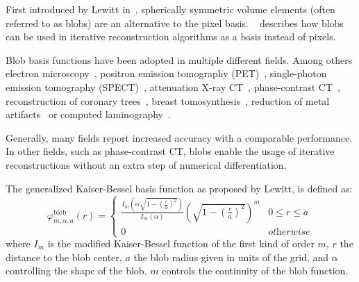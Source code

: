 First introduced by Lewitt in~\cite{lewitt_multidimensional_1990}, spherically symmetric volume
elements (often referred to as blobs) are an alternative to the pixel basis.
~\cite{lewitt_alternatives_1992} describes how blobs can be used in iterative reconstruction
algorithms as a basis instead of pixels.

Blob basis functions have been adopted in multiple different fields. Among others electron
microscopy~\cite{marabini_3d_1998, garduno_optimization_2001}, positron emission tomography
(PET)~\cite{jacobs_comparative_1999, chlewicki_noise_2004}, single-photon emission tomography
(SPECT)~\cite{wang_3d_2004, yendiki_comparison_2004}, attenuation X-ray
CT~\cite{jacobs_iterative_1999, carvalho_helical_2003, isola_motion-compensated_2008},
phase-contrast CT~\cite{kohler_iterative_2011, xu_investigation_2012}, reconstruction of coronary
trees~\cite{zhou_blob-based_2008}, breast tomosynthesis~\cite{wu_breast_2010}, reduction of metal
artifacts~\cite{levakhina_two-step_2010} or computed laminography~\cite{trampert_spherically_2017}.


Generally, many fields report increased accuracy with a comparable performance. In other fields,
such as phase-contrast CT, blobs enable the usage of iterative reconstructions without an extra step
of numerical differentiation.

The generalized Kaiser-Bessel basis function as proposed by Lewitt, is defined as:
\begin{equation}\label{eq:blob_basis_fn}
	\varphi^{\text{blob}}_{m, \alpha, a}(r) =
	\begin{cases}
		\frac{I_m\left( \alpha \sqrt{1 - \left(\frac{r}{a}\right)^2} \right)} {I_m\left( \alpha \right)} \left( \sqrt{1 - \left(\frac{r}{a}\right)^2}\right)^m & 0 \le r \le a      \\
		0                                                                                                                                                      & \textit{otherwise}
	\end{cases}
\end{equation}
where \(I_m\) is the modified Kaiser-Bessel function of the first kind of order \(m\), \(r\) the
distance to the blob center, \(a\) the blob radius given in units of the grid, and \(\alpha\)
controlling the shape of the blob. \(m\) controls the continuity of the blob function.

